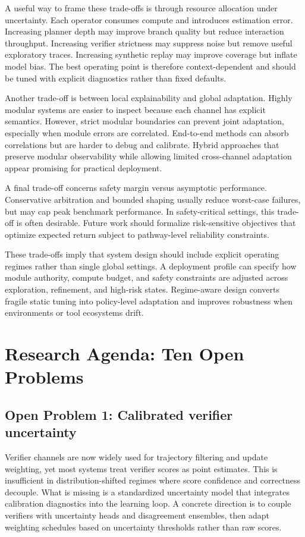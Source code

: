 \documentclass[pdflatex,sn-mathphys-num]{sn-jnl}
\begin{document}
A useful way to frame these trade-offs is through resource allocation under uncertainty. Each operator consumes compute and introduces estimation error. Increasing planner depth may improve branch quality but reduce interaction throughput. Increasing verifier strictness may suppress noise but remove useful exploratory traces. Increasing synthetic replay may improve coverage but inflate model bias. The best operating point is therefore context-dependent and should be tuned with explicit diagnostics rather than fixed defaults.

Another trade-off is between local explainability and global adaptation. Highly modular systems are easier to inspect because each channel has explicit semantics. However, strict modular boundaries can prevent joint adaptation, especially when module errors are correlated. End-to-end methods can absorb correlations but are harder to debug and calibrate. Hybrid approaches that preserve modular observability while allowing limited cross-channel adaptation appear promising for practical deployment.

A final trade-off concerns safety margin versus asymptotic performance. Conservative arbitration and bounded shaping usually reduce worst-case failures, but may cap peak benchmark performance. In safety-critical settings, this trade-off is often desirable. Future work should formalize risk-sensitive objectives that optimize expected return subject to pathway-level reliability constraints.

These trade-offs imply that system design should include explicit operating regimes rather than single global settings. A deployment profile can specify how module authority, compute budget, and safety constraints are adjusted across exploration, refinement, and high-risk states. Regime-aware design converts fragile static tuning into policy-level adaptation and improves robustness when environments or tool ecosystems drift.

\section{Research Agenda: Ten Open Problems}
\subsection{Open Problem 1: Calibrated verifier uncertainty}
Verifier channels are now widely used for trajectory filtering and update weighting, yet most systems treat verifier scores as point estimates. This is insufficient in distribution-shifted regimes where score confidence and correctness decouple. What is missing is a standardized uncertainty model that integrates calibration diagnostics into the learning loop. A concrete direction is to couple verifiers with uncertainty heads and disagreement ensembles, then adapt weighting schedules based on uncertainty thresholds rather than raw scores.
\end{document}
